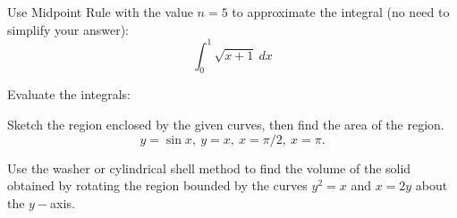 \documentclass[12pt]{exam}
\begin{document}
\newpage
\begin{questions}

\question[10] Use Midpoint Rule with the value \(n=5\) to approximate the integral (no need to simplify your answer):
\[
\int_0^1 \sqrt{x+1}~dx
\] 
\vfill
\droptotalpoints
\newpage

\question Evaluate the integrals:
\droptotalpoints
\newpage

\question[20] Sketch the region enclosed by the given curves, then find the area of the region. \[
y= \sin x,~ y=x, ~x =\pi/2,~x=\pi.
\]
\vfill
\droptotalpoints
\newpage

\question[20] Use the washer or cylindrical shell method to find the volume of the solid obtained by rotating the region bounded by the curves $y^2=x$ and $x=2y$ about the $y-$axis. 


\end{questions}
\end{document}
